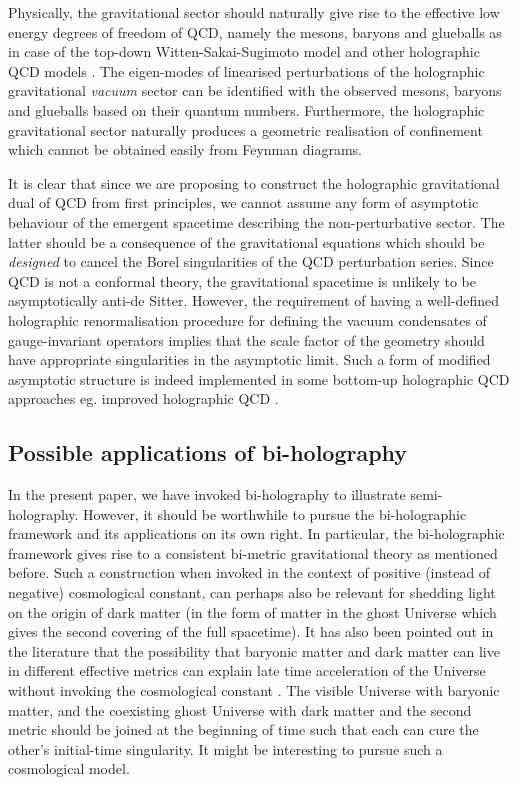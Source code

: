 \documentclass[prd,reprint,a4paper,showpacs,superscriptaddress,11pt,onecolumn,nofootinbib]{revtex4-1}
\renewcommand{\(}{\left(}
\renewcommand{\)}{\right)}
\newcommand{\6}{\partial}
\begin{document}
Physically, the gravitational sector should naturally give rise to the effective low energy degrees of freedom of QCD, namely the mesons, baryons and glueballs as in case of the top-down Witten-Sakai-Sugimoto model \cite{Witten:1998zw,Sakai:2004cn,Sakai:2005yt,Brunner:2015oqa} and other holographic QCD models \cite{Erlich:2005qh}. The eigen-modes of  linearised perturbations of the holographic gravitational \textit{vacuum} sector can be identified with the observed mesons, baryons and glueballs based on their quantum numbers. Furthermore, the holographic gravitational sector naturally produces a geometric realisation of confinement \cite{Witten:1998zw,Karch:2006pv} which cannot be obtained easily from Feynman diagrams.

It is clear that since we are proposing to construct the holographic gravitational dual of QCD from first principles, we cannot assume any form of asymptotic behaviour of the emergent spacetime describing the non-perturbative sector. The latter should be a consequence of the gravitational equations which should be \textit{designed} to cancel the Borel singularities of the QCD perturbation series. Since QCD is not a conformal theory, the gravitational spacetime is unlikely to be asymptotically anti-de Sitter. However, the requirement of having a well-defined holographic renormalisation procedure for defining the vacuum condensates of gauge-invariant operators implies that the scale factor of the geometry should have appropriate singularities in the asymptotic limit. Such a form of modified asymptotic structure is indeed implemented in some bottom-up holographic QCD approaches eg. improved holographic QCD \cite{Gursoy:2008za}.

\subsection{Possible applications of bi-holography}
In the present paper, we have invoked bi-holography to illustrate semi-holography. However, it should be worthwhile to pursue the bi-holographic framework and its applications on its own right. In particular, the bi-holographic framework gives rise to a consistent bi-metric gravitational theory as mentioned before. Such a construction when invoked in the context of positive (instead of negative) cosmological constant, can perhaps also be relevant for shedding light on the origin of dark matter (in the form of matter in the ghost Universe which gives the second covering of the full spacetime). It has also been pointed out in the literature that the possibility that baryonic matter and dark matter can live in different effective metrics can explain late time acceleration of the Universe without invoking the cosmological constant \cite{Berezhiani:2016dne}. The visible Universe with baryonic matter, and the coexisting ghost Universe with dark matter and the second metric should be joined at the beginning of time such that each can cure the other's initial-time singularity. It might be interesting to pursue such a cosmological model.
\end{document}
